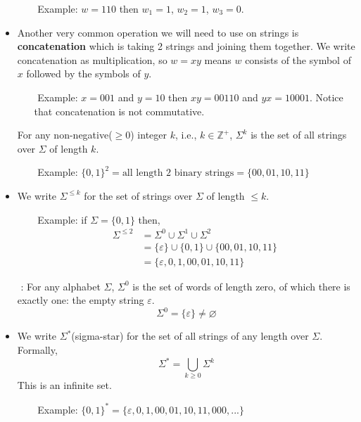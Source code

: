 \documentclass{article}
\begin{document}
\begin{itemize}
\begin{itemize}
        \item [$ $] Example: $w=110$ then $w_1=1$, $w_2=1$, $w_3=0$.
    \end{itemize}
    \item Another very common operation we will need to use on strings is \textbf{concatenation} which is taking 2 strings and joining them together. We write concatenation as multiplication, so $w=xy$ means $w$ consists of the symbol of $x$ followed by the symbols of $y$.
    \begin{itemize}
        \item [$ $] Example: $x=001$ and $y=10$ then $xy=00110$ and $yx=10001$. Notice that concatenation is not commutative.
    \end{itemize}
    \begin{tcolorbox} [title= Definition:, colback=black!10!white]
        For any non-negative($\ge 0$) integer $k$, i.e., $k\in\mathbb{Z}^+$, $\Sigma^k$ is the set of all strings over $\Sigma$ of length $k$.
    \end{tcolorbox}
    \begin{itemize}
        \item[$ $] Example: $\{0,1\}^2=\text{all length 2 binary strings} = \{00,01,10,11\}$
    \end{itemize} 
    \item We write $\Sigma^{\le k}$ for the set of strings over $\Sigma$ of length $\le k$. 
    \begin{itemize}
        \item [$ $] Example: if $\Sigma=\{0,1\}$ then,
        \begin{align*}
            \Sigma^{\le 2} &= \Sigma^0 \cup \Sigma^1 \cup \Sigma^2 \\
                           &= \{\varepsilon\} \cup \{0,1\} \cup \{00,01,10,11\} \\
                           &= \{\varepsilon, 0, 1, 00, 01, 10, 11\}
        \end{align*}
        

    \end{itemize}
    \item[$ $] : For any alphabet $\Sigma$, $\Sigma^0$ is the set of words of length zero, of which there is exactly one: the empty string $\varepsilon$.
    $$\Sigma^0 = \{\varepsilon\}\neq\varnothing$$
    \item We write $\Sigma^*$(sigma-star) for the set of all strings of any length over $\Sigma$. Formally, $$\Sigma^*=\bigcup_{k\ge0}\Sigma^k$$
    This is an infinite set.
    \begin{itemize}
        \item [$ $] Example: $\{0,1\}^*=\{\varepsilon, 0, 1, 00, 01, 10, 11, 000,...\}$
    \end{itemize}
\end{itemize}
\end{document}
